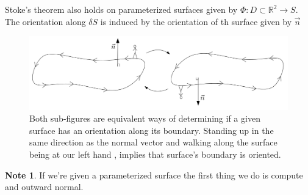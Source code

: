 \documentclass[
	12pt,
	]{article}
\newcommand{\R}{\mathbb{R}}
\theoremstyle{custom}
\theoremstyle{custom}
\theoremstyle{custom}
\theoremstyle{custom}
\theoremstyle{custom}
\theoremstyle{definition}
\theoremstyle{example}
\newtheorem*{note}{Note}
\theoremstyle{note}
\theoremstyle{remark}
\theoremstyle{example}
\newcounter{theo}[section]\setcounter{theo}{0}
\numberwithin{equation}{subsection}
\begin{document}
				\noindent Stoke's theorem also holds on parameterized surfaces given by $\Phi : D\subset \R^{2} \to S$. The orientation along $\delta S$ is induced by the orientation of th surface given by $\vec{n}$
				\begin{figure}[H]
					\centering
					\includegraphics[width=0.9\linewidth]{MATH314_Notes_Fig11.png}
					\captionsetup{margin=1.5cm , justification=raggedright} \caption{Both sub-figures are equivalent ways of determining if a given surface has an orientation along its boundary. Standing up in the same direction as the normal vector and walking along the surface being at our left hand , implies that surface's boundary is oriented.}
				\end{figure}
				
				\begin{note}
					If we're given a parameterized surface the first thing we do is compute and outward normal.
				\end{note}
				
\end{document}
